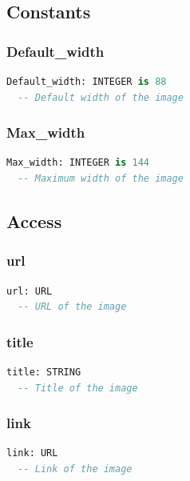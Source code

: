\subsection{Constants}
\label{sec:channel-image-constants}

\subsubsection{Default\_width}

\begin{lstlisting}[language=Eiffel]
Default_width: INTEGER is 88
  -- Default width of the image
\end{lstlisting}

\subsubsection{Max\_width}

\begin{lstlisting}[language=Eiffel]
Max_width: INTEGER is 144
  -- Maximum width of the image
\end{lstlisting}

\subsection{Access}
\label{sec:channel-image-access}

\subsubsection{url}

\begin{lstlisting}[language=Eiffel]
url: URL
  -- URL of the image
\end{lstlisting}

\subsubsection{title}

\begin{lstlisting}[language=Eiffel]
title: STRING
  -- Title of the image
\end{lstlisting}

\subsubsection{link}

\begin{lstlisting}[language=Eiffel]
link: URL
  -- Link of the image
\end{lstlisting}

